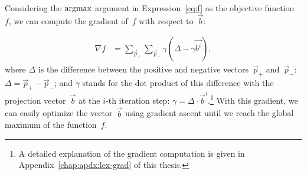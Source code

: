 
Considering the $\argmax$ argument in Expression~\ref{eq:f} as the
objective function~$f$, we can compute the gradient of~$f$ with
respect to~$\vec{b}$:

{\small%
  \begin{align}
    \nabla f &= \sum_{\vec{p}_+}\sum_{\vec{p}_-}%
    \gamma\left(\Delta - \gamma\vec{b^{i}}\right),\label{eq:prj-line-grad}%
\end{align}\normalsize}%
where $\Delta$ is the difference between the positive and negative
vectors~$\vec{p}_{+}$ and~$\vec{p}_{-}$:
$\Delta = \vec{p}_{+}-\vec{p}_{-}$; and $\gamma$ stands for the dot
product of this difference with the projection vector~$\vec{b}$ at the
$i$-th iteration step: $\gamma = \Delta \cdot \vec{b}^i$.\footnote{A
  detailed explanation of the gradient computation is given in
  Appendix~\ref{chap:apdx:lex-grad} of this thesis.}  With this
gradient, we can easily optimize the vector~$\vec{b}$ using gradient
ascent until we reach the global maximum of the function~$f$.


